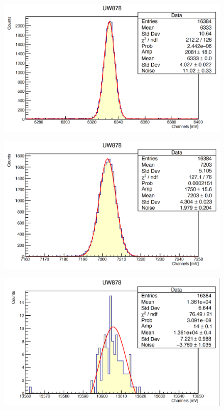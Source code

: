 \documentclass[a4paper,10pt]{article}
\begin{document}
\begin{figure}[H]
    \centering
    \includegraphics[scale=0.45]{appendice/u4}
\end{figure}
\begin{figure}[H]
    \centering
    \includegraphics[scale=0.45]{appendice/u5}
\end{figure}
\begin{figure}[H]
    \centering
    \includegraphics[scale=0.45]{appendice/u6}
\end{figure}
\end{document}
